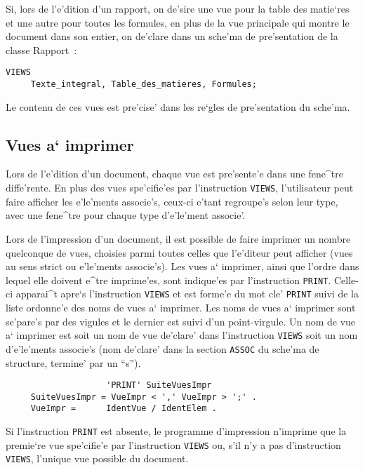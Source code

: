 {\begin{example}
Si, lors de l'e'dition d'un rapport, on de'sire une vue pour
la table des matie`res et une autre pour toutes les formules, en plus de la
vue principale qui montre le document dans son entier, on de'clare dans un
sche'ma de pre'sentation de la classe Rapport~:

\begin{verbatim}
VIEWS
     Texte_integral, Table_des_matieres, Formules;
\end{verbatim}

Le contenu de ces vues est pre'cise' dans les re`gles de pre'sentation du
sche'ma.
\end{example}

\subsection{Vues a` imprimer}

Lors de l'e'dition d'un document, chaque vue est pre'sente'e dans une
fene^tre diffe'rente. En plus des vues spe'cifie'es par l'instruction
{\tt VIEWS}, l'utilisateur peut faire afficher les e'le'ments associe's,
ceux-ci e'tant regroupe's selon leur type, avec une fene^tre pour chaque
type d'e'le'ment associe'.

Lors de l'impression d'un document, il est possible de faire imprimer
un nombre quelconque de vues, choisies parmi toutes celles que l'e'diteur
peut afficher (vues au sens strict ou e'le'ments associe's). Les vues a`
imprimer, ainsi que l'ordre dans lequel elle doivent e^tre imprime'es,
sont indique'es par l'instruction {\tt PRINT}. Celle-ci apparai^t
apre`s l'instruction {\tt VIEWS} et est forme'e du mot cle' {\tt PRINT}
suivi de la liste ordonne'e des noms de vues a` imprimer. Les noms de
vues a` imprimer sont se'pare's par des vigules et le dernier est suivi
d'un point-virgule. Un nom de vue a` imprimer est soit un nom de vue
de'clare' dans l'instruction {\tt VIEWS} soit un nom d'e'le'ments
associe's (nom de'clare' dans la section {\tt ASSOC} du sche'ma de structure,
termine' par un ``s'').

\begin{verbatim}
                    'PRINT' SuiteVuesImpr
     SuiteVuesImpr = VueImpr < ',' VueImpr > ';' .
     VueImpr =      IdentVue / IdentElem .
\end{verbatim}

Si l'instruction {\tt PRINT} est absente, le programme d'impression
n'imprime que la premie`re vue spe'cifie'e par l'instruction {\tt VIEWS}
ou, s'il n'y a pas d'instruction {\tt VIEWS}, l'unique vue possible du
document.

}
